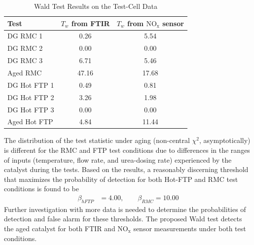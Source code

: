 \documentclass[subscriptcorrection,upint,varvw,barcolor=Goldenrod3,mathalfa=cal=euler,balance,hyphenate,french,pdf-a]{asmejour}
\newcommand{\nox}{\text{NO}_{\text{x}}}
\begin{document}
\begin{table}[ht]
        \centering
        \caption{Wald Test Results on the Test-Cell Data}
        \label{tab::Tw_tst}
        \begin{tabular}{l c c}
        \hline \hline
        Test & $T_w$ from FTIR & $T_w$ from $\nox$ sensor \\\hline \hline
        DG RMC 1      & 0.26 & 5.54\\
        DG RMC 2      & 0.00 & 0.00\\
        DG RMC 3      & 6.71 & 5.46\\
        Aged RMC      & 47.16 & 17.68\\
        \hline
        DG Hot FTP 1  & 0.49 & 0.81\\
        DG Hot FTP 2  & 3.26 & 1.98\\
        DG Hot FTP 3  & 0.00 & 0.00\\
        Aged Hot FTP  & 4.84 & 11.44\\
        \hline \hline
        \end{tabular}
\end{table}
The distribution of the test statistic under aging (non-central $\chi^2$, asymptotically) is different for the RMC and FTP
test conditions due to differences in the ranges of inputs (temperature, flow rate, and urea-dosing rate) experienced
by the catalyst during the tests. Based on the results, a reasonably discerning threshold that maximizes the probability of detection for both Hot-FTP and RMC test conditions is found to be
\begin{align}
        \beta_{hFTP} &= 4.00, \qquad \beta_{RMC} = 10.00
\end{align}
Further investigation with more data is needed to determine the probabilities of detection and false alarm for these
thresholds. The proposed Wald test detects the aged catalyst for both FTIR and $\nox$ sensor measurements under both
test conditions.
\end{document}
